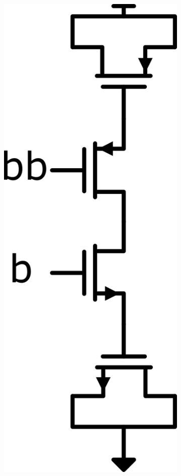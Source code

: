 \begin{figure}[H]
  \hfill
  \begin{subfigure}[b]{0.15\linewidth}
    \centering
    \includegraphics[width=\linewidth]{figures/Schematics/2P2N_cap.png}

\end{subfigure}
\end{figure}
